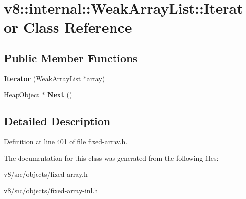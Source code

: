 \hypertarget{classv8_1_1internal_1_1WeakArrayList_1_1Iterator}{}\section{v8\+:\+:internal\+:\+:Weak\+Array\+List\+:\+:Iterator Class Reference}
\label{classv8_1_1internal_1_1WeakArrayList_1_1Iterator}
\subsection*{Public Member Functions}
\begin{DoxyCompactItemize}
\item 
\mbox{\label{classv8_1_1internal_1_1WeakArrayList_1_1Iterator_a415ab7893ed5c28f85c4d68e5a989a23}} 
{\bfseries Iterator} (\mbox{\hyperlink{classv8_1_1internal_1_1WeakArrayList}{Weak\+Array\+List}} $\ast$array)
\item 
\mbox{\label{classv8_1_1internal_1_1WeakArrayList_1_1Iterator_a64184d51dbc2a075e43bf74016a190f4}} 
\mbox{\hyperlink{classv8_1_1internal_1_1HeapObject}{Heap\+Object}} $\ast$ {\bfseries Next} ()
\end{DoxyCompactItemize}


\subsection{Detailed Description}


Definition at line 401 of file fixed-\/array.\+h.



The documentation for this class was generated from the following files\+:\begin{DoxyCompactItemize}
\item 
v8/src/objects/fixed-\/array.\+h\item 
v8/src/objects/fixed-\/array-\/inl.\+h\end{DoxyCompactItemize}
